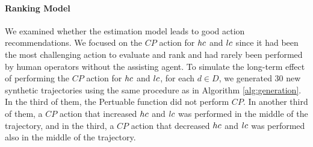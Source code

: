 

\paragraph{\bf Ranking Model}%
\label{sec:action_ordering}
We examined whether the estimation model leads to good action recommendations. We focused on the $CP$ action for $hc$ and $lc$ since it had been the most challenging action to evaluate and rank and had rarely been performed by human operators without the assisting agent. To simulate the long-term effect of performing the $CP$ action for $hc$ and $lc$,  for each $d\in D$, we generated $30$ new synthetic trajectories using the same procedure as in Algorithm \ref{alg:generation}.
In the third of them, the Pertuable function did not perform $CP$. In another third of them, a $CP$ action that increased $hc$ and $lc$ was performed in the middle of the trajectory, and in the third, a $CP$ action that decreased $hc$ and $lc$ was performed also in the middle of the trajectory.

